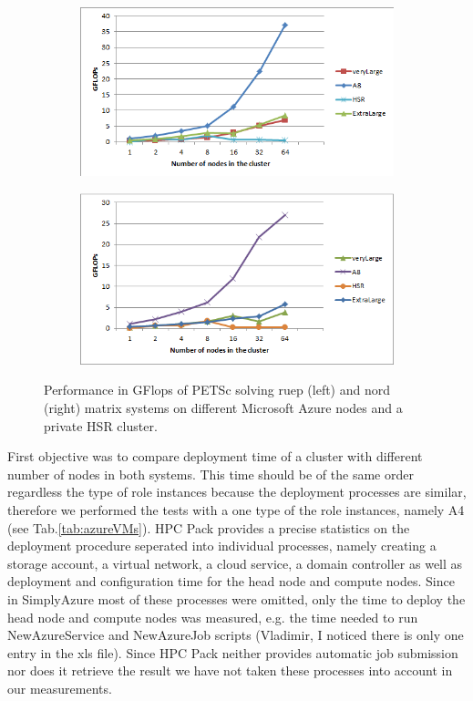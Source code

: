\documentclass[3p,times]{elsarticle}
\begin{document}
\begin{figure}
\centering
\begin{subfigure}{.5\textwidth}
  \centering
	\includegraphics[width=\linewidth]{ruppel}  
  \label{fig:ruepel}
\end{subfigure}%
\begin{subfigure}{.5\textwidth}
  \centering
  \includegraphics[width=\linewidth]{nord.png}
  \label{fig:nord}
\end{subfigure}
\caption{Performance in GFlops of PETSc solving ruep (left) and nord (right) matrix systems on different Microsoft Azure nodes and a private HSR cluster. }
\label{fig:test}
\end{figure}
 
First objective was to compare deployment time of a cluster with different number of nodes in both systems. This time should be of the same order regardless the type of role instances because the deployment processes are similar, therefore we performed the tests with a one type of the role instances, namely A4 (see Tab.\ref{tab:azureVMs}). HPC Pack provides a precise statistics on the deployment procedure seperated into individual processes, namely creating a storage account, a virtual network, a cloud service, a domain controller as well as  deployment and configuration time for the head node and compute nodes. Since in SimplyAzure most of these processes were omitted, only the time to deploy the head node and compute nodes was measured, e.g. the time needed to run NewAzureService and NewAzureJob scripts (\textcolor[rgb]{1,0,0}{Vladimir, I noticed there is only one entry in the xls file}). Since HPC Pack neither provides automatic job submission nor does it retrieve the result we have not taken these processes into account in our measurements. 
\end{document}
